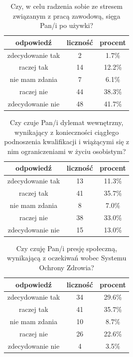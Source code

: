 \documentclass[a4paper,12pt,twoside,openany]{report}
\begin{document}
\begin{table}[h]
\caption{Czy, w celu radzenia sobie ze stresem związanym z pracą zawodową, sięga Pan/i po używki?}
\centering
\begin{tabular}{ | c | c | c |}
\hline
odpowiedź & liczność & procent\\
\hline
zdecydowanie tak  &  2  & 1.7\% \\
\hline
raczej tak  &  14  & 12.2\% \\
\hline
nie mam zdania  &  7  & 6.1\% \\
\hline
raczej nie  &  44  & 38.3\% \\
\hline
zdecydowanie nie  &  48  & 41.7\% \\
\hline
\end{tabular}
\label{tab:Q13}
\end{table}



\begin{table}[h]
\caption{Czy czuje Pan/i dylemat wewnętrzny, wynikający z konieczności ciągłego podnoszenia kwalifikacji i wiążącymi się z nim ograniczeniami w życiu osobistym?}
\centering
\begin{tabular}{ | c | c | c |}
\hline
odpowiedź & liczność & procent\\
\hline
zdecydowanie tak  &  13  & 11.3\% \\
\hline
raczej tak  &  41  & 35.7\% \\
\hline
nie mam zdania  &  8  & 7.0\% \\
\hline
raczej nie  &  38  & 33.0\% \\
\hline
zdecydowanie nie  &  15  & 13.0\% \\
\hline
\end{tabular}
\label{tab:Q14}
\end{table}



\begin{table}[h]
\caption{Czy czuję Pan/i presję społeczną, wynikającą z oczekiwań wobec Systemu Ochrony Zdrowia?}
\centering
\begin{tabular}{ | c | c | c |}
\hline
odpowiedź & liczność & procent\\
\hline
zdecydowanie tak  &  34  & 29.6\% \\
\hline
raczej tak  &  41  & 35.7\% \\
\hline
nie mam zdania  &  10  & 8.7\% \\
\hline
raczej nie  &  26  & 22.6\% \\
\hline
zdecydowanie nie  &  4  & 3.5\% \\
\hline
\end{tabular}
\label{tab:Q15}
\end{table}
\end{document}
